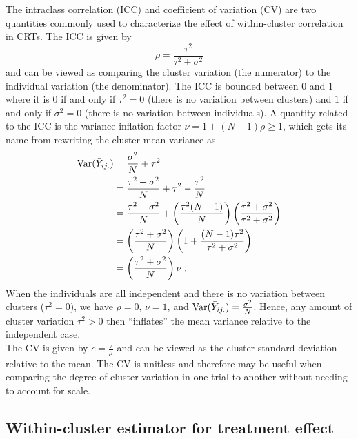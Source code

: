 \documentclass[10pt]{article}
\begin{document}
The intraclass correlation (ICC) and coefficient of variation (CV) are two quantities commonly used to characterize the effect of within-cluster correlation in CRTs. The ICC is given by
\[
\rho = \frac{\tau^2}{\tau^2+\sigma^2}
\]
and can be viewed as comparing the cluster variation (the numerator) to the individual variation (the denominator). The ICC is bounded between 0 and 1 where it is 0 if and only if $\tau^2=0$ (there is no variation between clusters) and $1$ if and only if $\sigma^2=0$ (there is no variation between individuals). A quantity related to the ICC is the variance inflation factor $\nu=1+(N-1)\rho\geq1$, which gets its name from rewriting the cluster mean variance as
\begin{align*}
\mathrm{Var}(\bar{Y}_{ij.}) &= \frac{\sigma^2}{N} + \tau^2 \\
&= \frac{\tau^2+\sigma^2}{N} + \tau^2 - \frac{\tau^2}{N} \\
&= \frac{\tau^2+\sigma^2}{N} + \left(\frac{\tau^2(N-1)}{N}\right)\left(\frac{\tau^2+\sigma^2}{\tau^2+\sigma^2}\right) \\
&= \left(\frac{\tau^2+\sigma^2}{N}\right)\left(1+\frac{(N-1)\tau^2}{\tau^2+\sigma^2}\right) \\
&= \left(\frac{\tau^2+\sigma^2}{N}\right)\nu \;.
\end{align*}
When the individuals are all independent and there is no variation between clusters ($\tau^2=0$), we have $\rho=0$, $\nu=1$, and $\mathrm{Var}(\bar{Y}_{ij.})=\frac{\sigma^2}{N}$. Hence, any amount of cluster variation $\tau^2>0$ then ``inflates'' the mean variance relative to the independent case.
\\

The CV is given by $c=\frac{\tau}{\mu}$ and can be viewed as the cluster standard deviation relative to the mean. The CV is unitless and therefore may be useful when comparing the degree of cluster variation in one trial to another without needing to account for scale.

\subsection{Within-cluster estimator for treatment effect} \label{apx:estimator}
\end{document}
